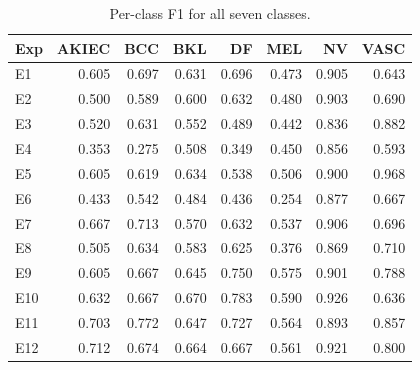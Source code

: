 \begin{table}
\caption{Per-class F1 for all seven classes.}
\label{tab:per_class_f1}
\begin{tabular}{lrrrrrrr}
\toprule
Exp & AKIEC & BCC & BKL & DF & MEL & NV & VASC \\
\midrule
E1 & 0.605 & 0.697 & 0.631 & 0.696 & 0.473 & 0.905 & 0.643 \\
E2 & 0.500 & 0.589 & 0.600 & 0.632 & 0.480 & 0.903 & 0.690 \\
E3 & 0.520 & 0.631 & 0.552 & 0.489 & 0.442 & 0.836 & 0.882 \\
E4 & 0.353 & 0.275 & 0.508 & 0.349 & 0.450 & 0.856 & 0.593 \\
E5 & 0.605 & 0.619 & 0.634 & 0.538 & 0.506 & 0.900 & 0.968 \\
E6 & 0.433 & 0.542 & 0.484 & 0.436 & 0.254 & 0.877 & 0.667 \\
E7 & 0.667 & 0.713 & 0.570 & 0.632 & 0.537 & 0.906 & 0.696 \\
E8 & 0.505 & 0.634 & 0.583 & 0.625 & 0.376 & 0.869 & 0.710 \\
E9 & 0.605 & 0.667 & 0.645 & 0.750 & 0.575 & 0.901 & 0.788 \\
E10 & 0.632 & 0.667 & 0.670 & 0.783 & 0.590 & 0.926 & 0.636 \\
E11 & 0.703 & 0.772 & 0.647 & 0.727 & 0.564 & 0.893 & 0.857 \\
E12 & 0.712 & 0.674 & 0.664 & 0.667 & 0.561 & 0.921 & 0.800 \\
\bottomrule
\end{tabular}
\end{table}
